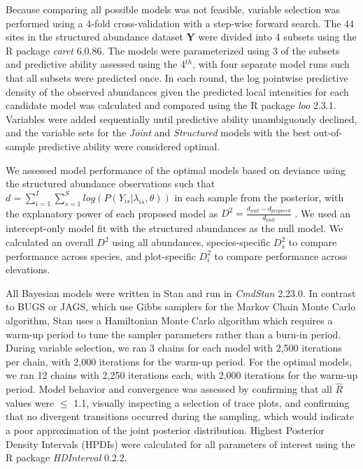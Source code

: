 \documentclass[preprint,review,times,12pt]{elsarticle}
\begin{document}
Because comparing all possible models was not feasible, variable selection was performed using a 4-fold cross-validation with a step-wise forward search. The 44 sites in the structured abundance dataset \textbf{Y} were divided into 4 subsets using the R package \emph{caret} 6.0.86. The models were parameterized using 3 of the subsets and predictive ability assessed using the 4$^{th}$, with four separate model runs such that all subsets were predicted once. In each round, the log pointwise predictive density of the observed abundances given the predicted local intensities for each candidate model was calculated and compared using the R package \emph{loo} 2.3.1. Variables were added sequentially until predictive ability unambiguously declined, and the variable sets for the \emph{Joint} and \emph{Structured} models with the best out-of-sample predictive ability were considered optimal.

We assessed model performance of the optimal models based on deviance using the structured abundance observations such that $d = \sum_{i=1}^{I}\sum_{s=1}^S log(P(Y_{is} | \lambda_{is}, \theta))$ in each sample from the posterior, with the explanatory power of each proposed model as $D^2 = \frac{d_{null} - d_{proposed}}{d_{null}}$ \citep{Guisan2000,Caradima2019}. We used an intercept-only model fit with the structured abundances as the null model. We calculated an overall $D^2$ using all abundances, species-specific $D^2_s$ to compare performance across species, and plot-specific $D^2_i$ to compare performance across elevations.

All Bayesian models were written in Stan \citep{Carpenter2017} and run in \emph{CmdStan} 2.23.0. In contrast to BUGS or JAGS, which use Gibbs samplers for the Markov Chain Monte Carlo algorithm, Stan uses a Hamiltonian Monte Carlo algorithm which requires a warm-up period to tune the sampler parameters rather than a burn-in period. During variable selection, we ran 3 chains for each model with 2,500 iterations per chain, with 2,000 iterations for the warm-up period. For the optimal models, we ran 12 chains with 2,250 iterations each, with 2,000 iterations for the warm-up period. Model behavior and convergence was assessed by confirming that all $\hat{R}$ values were $\leq$ 1.1, visually inspecting a selection of trace plots, and confirming that no divergent transitions occurred during the sampling, which would indicate a poor approximation of the joint posterior distribution. Highest Posterior Density Intervals (HPDIs) were calculated for all parameters of interest using the R package \emph{HDInterval} 0.2.2.
\end{document}
